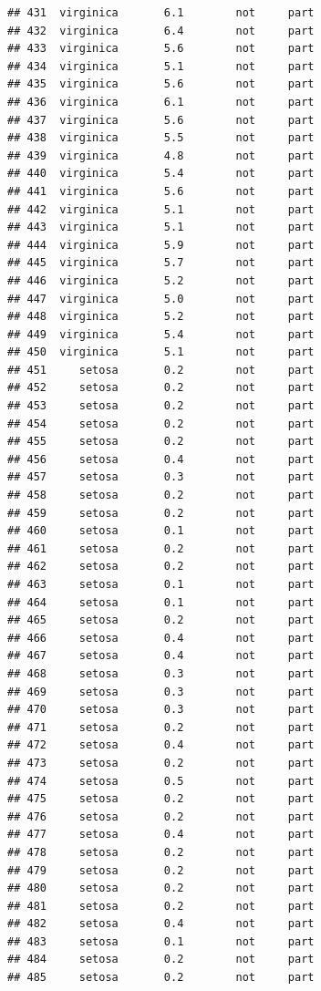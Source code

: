 \documentclass[krantz2]{krantz}\usepackage{knitr}%
\begin{document}
\begin{knitrout}
\begin{kframe}
\begin{verbatim}
## 431  virginica       6.1        not     part
## 432  virginica       6.4        not     part
## 433  virginica       5.6        not     part
## 434  virginica       5.1        not     part
## 435  virginica       5.6        not     part
## 436  virginica       6.1        not     part
## 437  virginica       5.6        not     part
## 438  virginica       5.5        not     part
## 439  virginica       4.8        not     part
## 440  virginica       5.4        not     part
## 441  virginica       5.6        not     part
## 442  virginica       5.1        not     part
## 443  virginica       5.1        not     part
## 444  virginica       5.9        not     part
## 445  virginica       5.7        not     part
## 446  virginica       5.2        not     part
## 447  virginica       5.0        not     part
## 448  virginica       5.2        not     part
## 449  virginica       5.4        not     part
## 450  virginica       5.1        not     part
## 451     setosa       0.2        not     part
## 452     setosa       0.2        not     part
## 453     setosa       0.2        not     part
## 454     setosa       0.2        not     part
## 455     setosa       0.2        not     part
## 456     setosa       0.4        not     part
## 457     setosa       0.3        not     part
## 458     setosa       0.2        not     part
## 459     setosa       0.2        not     part
## 460     setosa       0.1        not     part
## 461     setosa       0.2        not     part
## 462     setosa       0.2        not     part
## 463     setosa       0.1        not     part
## 464     setosa       0.1        not     part
## 465     setosa       0.2        not     part
## 466     setosa       0.4        not     part
## 467     setosa       0.4        not     part
## 468     setosa       0.3        not     part
## 469     setosa       0.3        not     part
## 470     setosa       0.3        not     part
## 471     setosa       0.2        not     part
## 472     setosa       0.4        not     part
## 473     setosa       0.2        not     part
## 474     setosa       0.5        not     part
## 475     setosa       0.2        not     part
## 476     setosa       0.2        not     part
## 477     setosa       0.4        not     part
## 478     setosa       0.2        not     part
## 479     setosa       0.2        not     part
## 480     setosa       0.2        not     part
## 481     setosa       0.2        not     part
## 482     setosa       0.4        not     part
## 483     setosa       0.1        not     part
## 484     setosa       0.2        not     part
## 485     setosa       0.2        not     part

\end{verbatim}
\end{kframe}
\end{knitrout}
\end{document}
